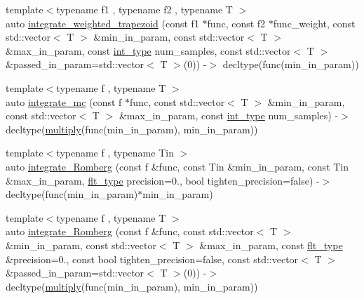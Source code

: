 \begin{DoxyCompactItemize}
\item 
{\footnotesize template$<$typename f1 , typename f2 , typename T $>$ }\\auto \hyperlink{namespaceIceBRG_a1964fd9e2f067b157d38557462743ff2}{integrate\+\_\+weighted\+\_\+trapezoid} (const f1 $\ast$func, const f2 $\ast$func\+\_\+weight, const std\+::vector$<$ T $>$ \&min\+\_\+in\+\_\+param, const std\+::vector$<$ T $>$ \&max\+\_\+in\+\_\+param, const \hyperlink{lib_2IceBRG__main_2common_8h_ac4de9d9335536ac22821171deec8d39e}{int\+\_\+type} num\+\_\+samples, const std\+::vector$<$ T $>$ \&passed\+\_\+in\+\_\+param=std\+::vector$<$ T $>$(0)) -\/$>$ decltype(func(min\+\_\+in\+\_\+param))
\item 
{\footnotesize template$<$typename f , typename T $>$ }\\auto \hyperlink{namespaceIceBRG_a181746e5e29de9697625ef0b723a483f}{integrate\+\_\+mc} (const f $\ast$func, const std\+::vector$<$ T $>$ \&min\+\_\+in\+\_\+param, const std\+::vector$<$ T $>$ \&max\+\_\+in\+\_\+param, const \hyperlink{lib_2IceBRG__main_2common_8h_ac4de9d9335536ac22821171deec8d39e}{int\+\_\+type} num\+\_\+samples) -\/$>$ decltype(\hyperlink{namespaceIceBRG_ab535c998baac3ffc8412fdbae750b7d1}{multiply}(func(min\+\_\+in\+\_\+param), min\+\_\+in\+\_\+param))
\item 
{\footnotesize template$<$typename f , typename Tin $>$ }\\auto \hyperlink{namespaceIceBRG_a7c0ae4acaf423cd7583952bfca121235}{integrate\+\_\+\+Romberg} (const f \&func, const Tin \&min\+\_\+in\+\_\+param, const Tin \&max\+\_\+in\+\_\+param, \hyperlink{lib_2IceBRG__main_2common_8h_ad0f130a56eeb944d9ef2692ee881ecc4}{flt\+\_\+type} precision=0., bool tighten\+\_\+precision=false) -\/$>$ decltype(func(min\+\_\+in\+\_\+param)$\ast$min\+\_\+in\+\_\+param)
\item 
{\footnotesize template$<$typename f , typename T $>$ }\\auto \hyperlink{namespaceIceBRG_a00d3f49b1b1603459621f0772ca9cbbe}{integrate\+\_\+\+Romberg} (const f \&func, const std\+::vector$<$ T $>$ \&min\+\_\+in\+\_\+param, const std\+::vector$<$ T $>$ \&max\+\_\+in\+\_\+param, const \hyperlink{lib_2IceBRG__main_2common_8h_ad0f130a56eeb944d9ef2692ee881ecc4}{flt\+\_\+type} \&precision=0., const bool tighten\+\_\+precision=false, const std\+::vector$<$ T $>$ \&passed\+\_\+in\+\_\+param=std\+::vector$<$ T $>$(0)) -\/$>$ decltype(\hyperlink{namespaceIceBRG_ab535c998baac3ffc8412fdbae750b7d1}{multiply}(func(min\+\_\+in\+\_\+param), min\+\_\+in\+\_\+param))
\item 

\end{DoxyCompactItemize}
